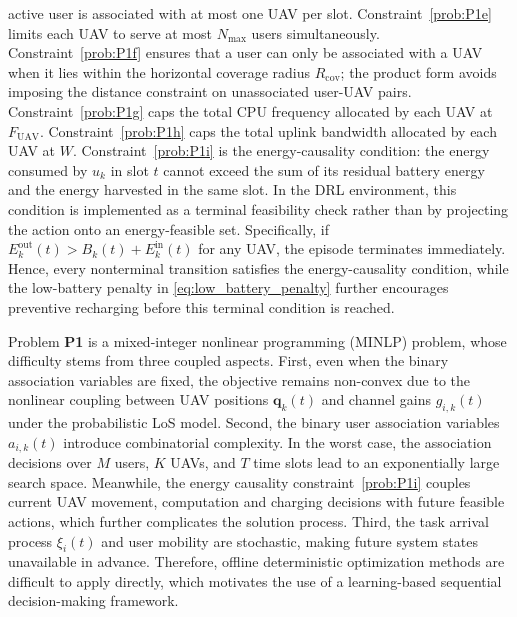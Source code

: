 \documentclass[journal]{IEEEtran}
\begin{document}
active user is associated with at most one UAV per slot.
Constraint~\eqref{prob:P1e} limits each UAV to serve
at most $N_{\max}$ users simultaneously.
Constraint~\eqref{prob:P1f} ensures that a user can
only be associated with a UAV when it lies within the
horizontal coverage radius $R_{\mathrm{cov}}$;
the product form avoids imposing the distance constraint
on unassociated user-UAV pairs.
Constraint~\eqref{prob:P1g} caps the total CPU frequency
allocated by each UAV at $F_{\mathrm{UAV}}$.
Constraint~\eqref{prob:P1h} caps the total uplink
bandwidth allocated by each UAV at $W$.
Constraint~\eqref{prob:P1i} is the energy-causality condition: the energy
consumed by $u_k$ in slot $t$ cannot exceed the sum of its residual battery
energy and the energy harvested in the same slot. In the DRL environment,
this condition is implemented as a terminal feasibility check rather than by
projecting the action onto an energy-feasible set. Specifically, if
$E_k^{\mathrm{out}}(t)>B_k(t)+E_k^{\mathrm{in}}(t)$ for any UAV, the episode
terminates immediately. Hence, every nonterminal transition satisfies the
energy-causality condition, while the low-battery penalty in
\eqref{eq:low_battery_penalty} further encourages preventive recharging
before this terminal condition is reached.





Problem \textbf{P1} is a mixed-integer nonlinear programming (MINLP) 
problem, whose difficulty stems from three coupled aspects. 
First, even when the binary association variables are fixed, 
the objective remains non-convex due to the nonlinear coupling 
between UAV positions \(\bm{q}_k(t)\) and channel gains 
\(g_{i,k}(t)\) under the probabilistic LoS model. 
Second, the binary user association variables \(a_{i,k}(t)\) 
introduce combinatorial complexity. In the worst case, the 
association decisions over \(M\) users, \(K\) UAVs, and \(T\) 
time slots lead to an exponentially large search space. 
Meanwhile, the energy causality constraint~\eqref{prob:P1i} 
couples current UAV movement, computation and 
charging decisions with future feasible actions, which further 
complicates the solution process. Third, the task arrival 
process \(\xi_i(t)\) and user mobility are stochastic, making 
future system states unavailable in advance. Therefore, offline 
deterministic optimization methods are difficult to apply 
directly, which motivates the use of a learning-based sequential 
decision-making framework.
\end{document}
